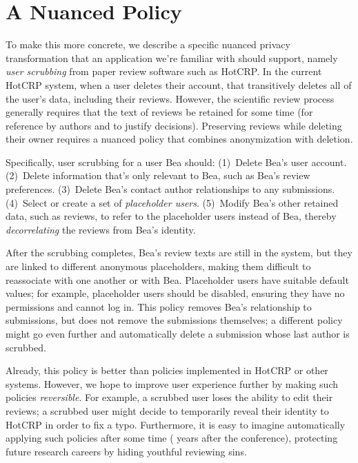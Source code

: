 \section{A Nuanced Policy}
\label{design:eg}


To make this more concrete, we describe a specific nuanced privacy
transformation that an application we're familiar with should support, namely
\emph{user scrubbing} from paper review software such as HotCRP.
%
In the current HotCRP system, when a user deletes their account, that
transitively deletes all of the user's data, including their reviews.
%
However, the scientific review process generally requires that the text of
reviews be retained for some time (for reference by authors and to justify
decisions).
%
Preserving reviews while deleting their owner requires a nuanced policy
that combines anonymization with deletion.


Specifically, user scrubbing for a user Bea should:
%
(1)~Delete Bea's user account.
%
(2)~Delete information that's only relevant to Bea, such as Bea's review
preferences.
%
(3)~Delete Bea's contact author relationships to any submissions.
%
(4)~Select or create a set of \emph{placeholder users}.
%
(5)~Modify Bea's other retained data, such as reviews, to refer to the
placeholder users instead of Bea, thereby \emph{decorrelating} the reviews from Bea's identity.


After the scrubbing completes, Bea's review texts are still in the system, but
they are linked to different anonymous placeholders, making them difficult to
reassociate with one another or with Bea.
%
Placeholder users have suitable default values; for example, placeholder
users should be disabled,
ensuring they have no permissions and cannot log in.
%
This policy removes Bea's relationship to submissions, but does not remove the
submissions themselves; a different policy might go even further and
automatically delete a submission whose last author is scrubbed.
%

Already, this policy is better than policies implemented in HotCRP or other systems.
%
However, we hope to improve user experience further by making such policies
\emph{reversible}.
%
For example, a scrubbed user loses the ability to edit their reviews; a
scrubbed user might decide to temporarily reveal their identity to HotCRP in
order to fix a typo.
%
Furthermore, it is easy to imagine automatically applying such policies
after some time ( years after the conference), protecting future
research careers by hiding youthful reviewing sins.
%


